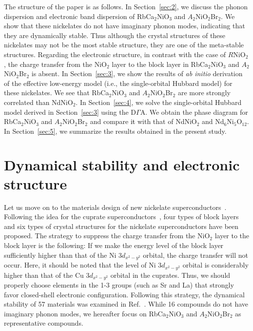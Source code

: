 \documentclass[%
 aip,
 amsmath,amssymb,
 reprint,%
]{revtex4-1}
\newcommand{\mk}[1]{{\textcolor{black}{#1}}}
\begin{document}
The structure of the paper is as follows. In Section~\ref{sec:2}, we discuss the phonon dispersion and electronic band dispersion of RbCa$_2$NiO$_3$ and $A_2$NiO$_2$Br$_2$. We show that these nickelates do not have imaginary phonon modes, indicating that they are dynamically stable. Thus although the crystal structures of these nickelates may not be the most stable structure, they are one of the meta-stable structures. Regarding the electronic structure, in contrast with the case of $R$NiO$_2$, the charge transfer from the NiO$_2$ layer to the block layer in RbCa$_2$NiO$_3$ and $A_2$NiO$_2$Br$_2$ is absent. In Section~\ref{sec:3}, we show the results of {\it ab initio} derivation of the effective low-energy model (i.e., the single-orbital Hubbard model) for these nickelates. We see that RbCa$_2$NiO$_3$ and $A_2$NiO$_2$Br$_2$ are more strongly correlated than NdNiO$_2$. In Section~\ref{sec:4}, we solve the single-orbital Hubbard model derived in Section~\ref{sec:3} using the D$\Gamma$A. We obtain the phase diagram for RbCa$_2$NiO$_3$ and $A_2$NiO$_2$Br$_2$ and compare \mk{it} with that of NdNiO$_2$ and Nd$_6$Ni$_5$O$_{12}$. In Section~\ref{sec:5}, we summarize the results obtained in the present study.

\section{Dynamical stability and electronic structure\label{sec:2}}
Let us move on to the materials design of new nickelate superconductors~\cite{Hirayama_2020}. Following the idea for the cuprate superconductors~\cite{Tokura_1990}, four types of block layers and six types of crystal structures for the nickelate superconductors have been proposed. The strategy to suppress the charge transfer from the NiO$_2$ layer to the block layer is the following: If we make the energy level of the block layer sufficiently higher than that of the Ni 3$d_{x^2-y^2}$ orbital, the charge transfer will not occur. Here, it should be noted that the level of Ni 3$d_{x^2-y^2}$ orbital is considerably higher than that of the Cu 3$d_{x^2-y^2}$ orbital in the cuprates. Thus, we should properly choose elements in the 1-3 groups (such as Sr and La) that strongly favor closed-shell electronic configuration. Following this strategy, the dynamical stability of 57 materials was examined in Ref.~. While 16 compounds do not have imaginary phonon modes, we hereafter focus on RbCa$_2$NiO$_3$ and $A_2$NiO$_2$Br$_2$ as representative compounds.
\end{document}
